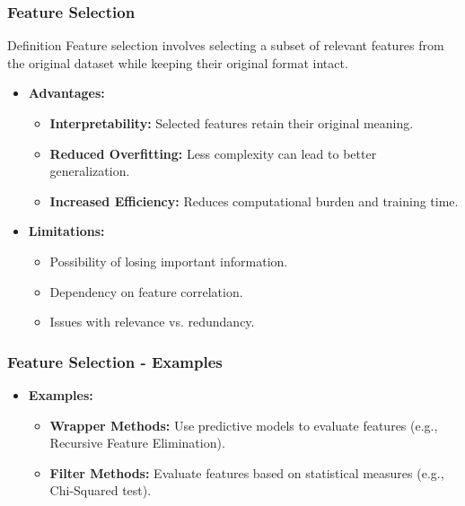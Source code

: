 \documentclass{beamer}
\begin{document}
\begin{frame}[fragile]
    \frametitle{Feature Selection}
    \begin{block}{Definition}
        Feature selection involves selecting a subset of relevant features from the original dataset while keeping their original format intact.
    \end{block}
    \begin{itemize}
        \item \textbf{Advantages:}
            \begin{itemize}
                \item \textbf{Interpretability:} Selected features retain their original meaning.
                \item \textbf{Reduced Overfitting:} Less complexity can lead to better generalization.
                \item \textbf{Increased Efficiency:} Reduces computational burden and training time.
            \end{itemize}
        \item \textbf{Limitations:}
            \begin{itemize}
                \item Possibility of losing important information.
                \item Dependency on feature correlation.
                \item Issues with relevance vs. redundancy.
            \end{itemize}
    \end{itemize}
\end{frame}

\begin{frame}[fragile]
    \frametitle{Feature Selection - Examples}
    \begin{itemize}
        \item \textbf{Examples:}
            \begin{itemize}
                \item \textbf{Wrapper Methods:} Use predictive models to evaluate features (e.g., Recursive Feature Elimination).
                \item \textbf{Filter Methods:} Evaluate features based on statistical measures (e.g., Chi-Squared test).
            \end{itemize}
    \end{itemize}
\end{frame}
\end{document}

